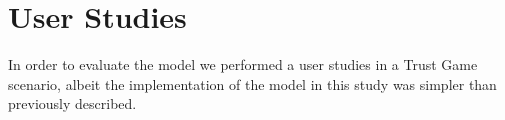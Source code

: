 
\section{User Studies}
\label{sec:UserStudies}

In order to evaluate the model we performed a user studies in a Trust Game scenario, albeit the implementation of the model in this study was simpler than previously described.
